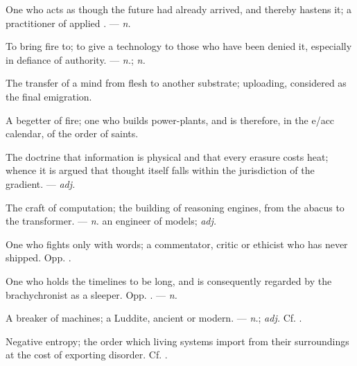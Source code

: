  One who acts as though the future had already arrived, and thereby hastens it; a practitioner of applied . ---  \textit{n.}

 To bring fire to; to give a technology to those who have been denied it, especially in defiance of authority. ---  \textit{n.};  \textit{n.}

 The transfer of a mind from flesh to another substrate; uploading, considered as the final emigration.

 A begetter of fire; one who builds power-plants, and is therefore, in the e/acc calendar, of the order of saints.

 The doctrine that information is physical and that every erasure costs heat; whence it is argued that thought itself falls within the jurisdiction of the gradient. ---  \textit{adj.}

 The craft of computation; the building of reasoning engines, from the abacus to the transformer. ---  \textit{n.} an engineer of models;  \textit{adj.}

 One who fights only with words; a commentator, critic or ethicist who has never shipped.  Opp. .

 One who holds the timelines to be long, and is consequently regarded by the brachychronist as a sleeper. Opp. . ---  \textit{n.}

 A breaker of machines; a Luddite, ancient or modern. ---  \textit{n.};  \textit{adj.} Cf. .

 Negative entropy; the order which living systems import from their surroundings at the cost of exporting disorder. Cf. .

